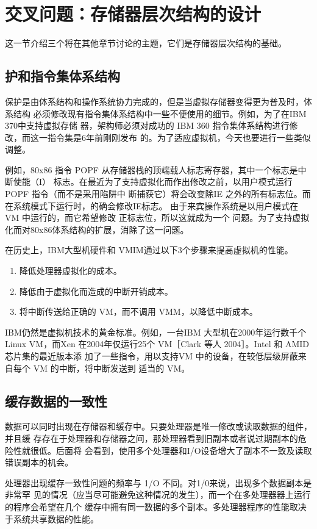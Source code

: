 \section{交叉问题：存储器层次结构的设计}
这一节介绍三个将在其他章节讨论的主题，它们是存储器层次结构的基础。

\subsection{护和指令集体系结构}
保护是由体系结构和操作系统协力完成的，但是当虚拟存储器变得更为普及时，体系结构
必须修改现有指令集体系结构中一些不便使用的细节。例如，为了在IBM 370中支持虚拟存储
器，架构师必须对成功的 IBM 360 指令集体系结构进行修改，而这一指令集是6年前刚刚发布
的。为了适应虚拟机，今天也要进行一些类似调整。

例如，80x86 指令 POPF 从存储器栈的顶端载人标志寄存器，其中一个标志是中断使能（I）
标志。在最近为了支持虚拟化而作出修改之前，以用户模式运行 POPF 指令（而不是采用陷阱中
断捕获它）将会改变除IE 之外的所有标志位。而在系统模式下运行时，的确会修改IE标志。
由于来宾操作系统是以用户模式在VM 中运行的，而它希望修改 正标志位，所以这就成为一个
问题。为了支持虚拟化而对80x86体系结构的扩展，消除了这一问题。

在历史上，IBM大型机硬件和 VMIM通过以下3个步骤来提高虚拟机的性能。
\begin{enumerate}
    \item 降低处理器虚拟化的成本。
    \item 降低由于虚拟化而造成的中断开销成本。
    \item 将中断传送给正确的 VM，而不调用 VMM，以降低中断成本。
\end{enumerate}

IBM仍然是虚拟机技术的黄金标准。例如，一台IBM 大型机在2000年运行数千个 Linux
VM，而Xen 在2004年仅运行25个 VM［Clark 等人 2004］。Intel 和 AMID 芯片集的最近版本添
加了一些指令，用以支持VM 中的设备，在较低层级屏蔽来自每个 VM 的中断，将中断发送到
适当的 VM。

\subsection{缓存数据的一致性}

数据可以同时出现在存储器和缓存中。只要处理器是唯一修改或读取数据的组件，并且缓
存存在于处理器和存储器之间，那处理器看到旧副本或者说过期副本的危险性就很低。后面将
会看到，使用多个处理器和I/O设备增大了副本不一致及读取错误副本的机会。

处理器出现缓存一致性问题的频率与 1/O 不同。对1/0来说，出现多个数据副本是非常罕
见的情况（应当尽可能避免这种情况的发生），而一个在多处理器器上运行的程序会希望在几个
缓存中拥有同一数据的多个副本。多处理器程序的性能取决于系统共享数据的性能。

